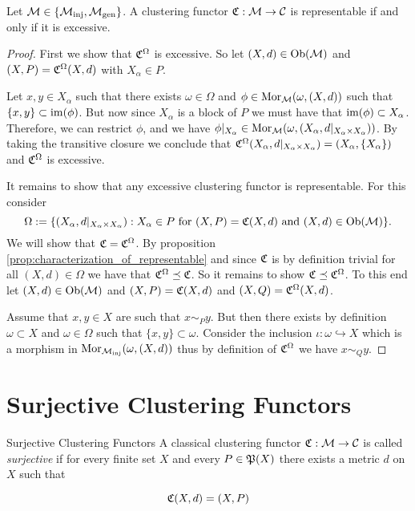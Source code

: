 \begin{theorem}{\cite[Thm.~6.2]{Carlsson2010}}{}
Let $\M \in \{\inj, \gen\}$. A clustering functor $\Cf: \M \to \C$ is representable if and only if it is excessive.
\end{theorem}

\begin{proof}
First we show that $\Cf^\Omega$ is excessive. So let $(X,d) \in \ob(\M)$ and $(X,P) = \Cf^\Omega(X,d)$ with $X_\alpha \in P$.

Let $x,y \in X_\alpha$ such that there exists $\omega \in \Omega$ and $\phi \in \mor_\M(\omega, (X,d))$ such that $\{x,y\} \subset \image(\phi)$. But now since $X_\alpha$ is a block of $P$ we must have that $\image(\phi) \subset X_\alpha$. Therefore, we can restrict $\phi$, and we have $\phi|_{X_\alpha} \in \mor_\M(\omega, (X_\alpha, d|_{X_\alpha \times X_\alpha}))$. By taking the transitive closure we conclude that $\Cf^\Omega(X_\alpha, d|_{X_\alpha \times X_\alpha}) = (X_\alpha, \{X_\alpha\})$ and $\Cf^\Omega$ is excessive.

It remains to show that any excessive clustering functor is representable. For this consider
$$
\Omega := \{(X_\alpha, d|_{X_\alpha \times X_\alpha}): X_\alpha \in P \text{ for } (X, P) = \Cf(X,d) \text{ and } (X,d) \in \ob(\M)\}.
$$
We will show that $\Cf = \Cf^\Omega$. By proposition \ref{prop:characterization_of_representable} and since $\Cf$ is by definition trivial for all $(X,d) \in \Omega$ we have that $\Cf^\Omega \refines \Cf$. So it remains to show $\Cf \refines \Cf^\Omega$. To this end let $(X,d) \in \ob(\M)$ and $(X,P) = \Cf(X,d)$ and $(X,Q) = \Cf^\Omega(X,d)$.

Assume that $x,y \in X$ are such that $x \sim_P y$. But then there exists by definition $\omega \subset X$ and $\omega \in \Omega$ such that $\{x,y\} \subset \omega$. Consider the inclusion $\iota: \omega \hookrightarrow X$ which is a morphism in $\mor_\inj(\omega, (X,d))$ thus by definition of $\Cf^\Omega$ we have $x \sim_Q y$.

\end{proof}

\section{Surjective Clustering Functors}

\begin{definition}{Surjective Clustering Functors}{}
    A classical clustering functor $\Cf: \M \to \C$ is called \emph{surjective} if for every finite set $X$ and every $P \in \P(X)$ there exists a metric $d$ on $X$ such that

    \begin{equation*}
        \Cf(X,d) = (X,P)
    \end{equation*}

\end{definition}


